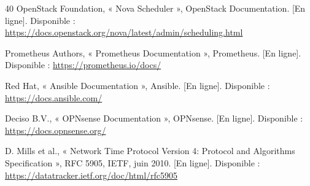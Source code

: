 \begin{thebibliography}{40}
OpenStack Foundation, « Nova Scheduler », OpenStack Documentation. [En ligne]. Disponible : \url{https://docs.openstack.org/nova/latest/admin/scheduling.html}

Prometheus Authors, « Prometheus Documentation », Prometheus. [En ligne]. Disponible : \url{https://prometheus.io/docs/}

Red Hat, « Ansible Documentation », Ansible. [En ligne]. Disponible : \url{https://docs.ansible.com/}

Deciso B.V., « OPNsense Documentation », OPNsense. [En ligne]. Disponible : \url{https://docs.opnsense.org/}

D. Mills et al., « Network Time Protocol Version 4: Protocol and Algorithms Specification », RFC 5905, IETF, juin 2010. [En ligne]. Disponible : \url{https://datatracker.ietf.org/doc/html/rfc5905}

\end{thebibliography}
